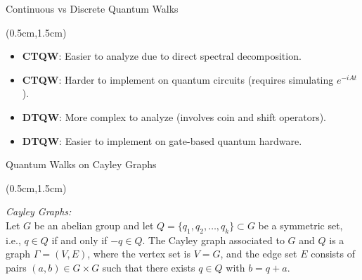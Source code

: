 \documentclass{beamer}
\theoremstyle{definition}
\begin{document}
\begin{frame}{Continuous vs Discrete Quantum Walks }
    
    \begin{textblock*}{12cm}(0.5cm,1.5cm)
        \vspace{0.5cm}

        \begin{itemize}
            \item \textbf{CTQW}: Easier to analyze due to direct spectral decomposition.
            \vspace{0.3cm}
            \item \textbf{CTQW}: Harder to implement on quantum circuits (requires simulating \( e^{-iAt} \)).
            \vspace{0.3cm}
            \item \textbf{DTQW}: More complex to analyze (involves coin and shift operators).
            \vspace{0.3cm}
            \item \textbf{DTQW}: Easier to implement on gate-based quantum hardware.
        \end{itemize}

                   
    \end{textblock*}
\end{frame}









\begin{frame}{Quantum Walks on Cayley Graphs}
    
    \begin{textblock*}{12cm}(0.5cm,1.5cm)
        
        \textit{Cayley Graphs:} \\
        \vspace{0.3cm}
        Let $G$ be an abelian group and let $Q = \{q_1, q_2, \dots, q_k\} \subset G$ be a symmetric set, i.e., $q \in Q$ if and only if $-q \in Q$. The Cayley graph associated to $G$ and $Q$ is a graph $\Gamma = (V, E)$, where the vertex set is $V = G$, and the edge set $E$ consists of pairs $(a, b) \in G \times G$ such that there exists $q \in Q$ with $b = q + a$. \\
      
    \end{textblock*}

\end{frame}
\end{document}
